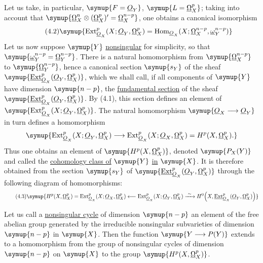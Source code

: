 Let us take, in particular, $\symup{F=\Osh_Y}$, $\symup{L=\underline{\Omega}_X^{p}}$; taking into account that
$\symup{\underline{\Omega}_X^{n}\otimes(\underline{\Omega}_X^{p})'=\underline{\Omega}_X^{n-p}}$, one obtains a canonical
isomorphism
\begin{equation}\tag{4.2}
  \symup{\operatorname{Ext}_{\Osh_X}^{p}(X;\Osh_Y,\underline{\Omega}_X^{p})
  =\operatorname{Hom}_{\Osh_X}
  (X;\underline{\Omega}_X^{n-p},\underline{\omega}_Y^{n-p})}
\end{equation}
Let us now suppose $\symup{Y}$ \uline{nonsingular} for simplicity, so that
$\symup{\underline{\omega}_Y^{n-p}=\underline{\Omega}_Y^{n-p}}$. There is a natural homomorphism from
$\symup{\underline{\Omega}_X^{n-p}}$ to $\symup{\underline{\Omega}_Y^{n-p}}$, hence a canonical section $\symup{s_Y}$ of the
sheaf $\symup{\Extsh_{\Osh_X}^{p}(\Osh_Y,\underline{\Omega}_X^{p})}$, which we shall call, if all components of $\symup{Y}$ have
dimension $\symup{n-p}$, the \uline{fundamental section} of the sheaf
$\symup{\Extsh_{\Osh_X}^{p}(\Osh_Y,\underline{\Omega}_X^{p})}$. By (4.1), this section defines an
element of $\symup{\operatorname{Ext}_{\Osh_X}^{p}(X;\Osh_Y,\underline{\Omega}_X^{p})}$. The natural
homomorphism $\symup{\Osh_X\longrightarrow\Osh_Y}$ in turn defines a homomorphism
\[
  \symup{\operatorname{Ext}_{\Osh_X}^{p}(X;\Osh_Y,\underline{\Omega}_X^{p})
  \longrightarrow
  \operatorname{Ext}_{\Osh_X}^{p}(X;\Osh_X,\underline{\Omega}_X^{p})
  =H^{p}(X,\underline{\Omega}_X^{p}).}
\]
Thus one obtains an element of $\symup{H^{p}(X,\underline{\Omega}_X^{p})}$, denoted $\symup{P_X(Y)}$ and
called the \uline{cohomology class of} $\symup{Y}$ \uline{in} $\symup{X}$. It is therefore obtained from
the section $\symup{s_Y}$ of $\symup{\Extsh_{\Osh_X}^{p}(\Osh_Y,\underline{\Omega}_X^{p})}$ through the
following diagram of homomorphisms:
\begin{equation}\tag{4.3}
\symup{H^{p}(X,\underline{\Omega}_X^{p})
=\operatorname{Ext}_{\Osh_X}^{p}(X;\Osh_X,\underline{\Omega}_X^{p})
\longleftarrow\operatorname{Ext}_{\Osh_X}^{p}(X;\Osh_Y,\underline{\Omega}_X^{p})
\xrightarrow{\ \sim\ }
H^{0}\!\left(X,\Extsh_{\Osh_X}^{p}(\Osh_Y,\underline{\Omega}_X^{p})\right)}
\end{equation}

Let us call a \uline{nonsingular cycle} of dimension $\symup{n-p}$ an element of the free
abelian group generated by the irreducible nonsingular subvarieties of dimension
$\symup{n-p}$ in $\symup{X}$. Then the function $\symup{Y\longrightarrow P(Y)}$ extends to a homomorphism
from the group of nonsingular cycles of dimension $\symup{n-p}$ on $\symup{X}$ to the group
$\symup{H^{p}(X,\underline{\Omega}_X^{p})}$.

